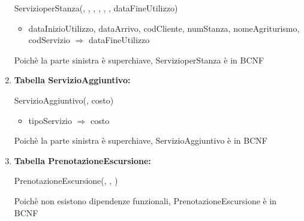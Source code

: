 \documentclass[12pt,a4paper]{article}
\begin{document}
\begin{enumerate}
ServizioperStanza(\underline{}, \underline{}, \underline{}, \underline{}, \underline{}, \underline{}, dataFineUtilizzo)
\begin{itemize}
\vspace{-5pt}
\item dataInizioUtilizzo, dataArrivo, codCliente, numStanza, nomeAgriturismo, codServizio $\Rightarrow$ dataFineUtilizzo
\vspace{-5pt}
\end{itemize}
Poichè la parte sinistra è superchiave, ServizioperStanza è in BCNF
\vspace{10pt}



\item[] \textbf{Tabella ServizioAggiuntivo:}

ServizioAggiuntivo(\underline{}, costo)
\begin{itemize}
\vspace{-5pt}
\item tipoServizio $\Rightarrow$ costo
\vspace{-5pt}
\end{itemize}
Poichè la parte sinistra è superchiave, ServizioAggiuntivo è in BCNF
\vspace{10pt}



\item[] \textbf{Tabella PrenotazioneEscursione:}

PrenotazioneEscursione(\underline{},  \underline{}, \underline{})

Poichè non esistono dipendenze funzionali, PrenotazioneEscursione è in BCNF
\vspace{10pt}




\end{enumerate}
\end{document}
